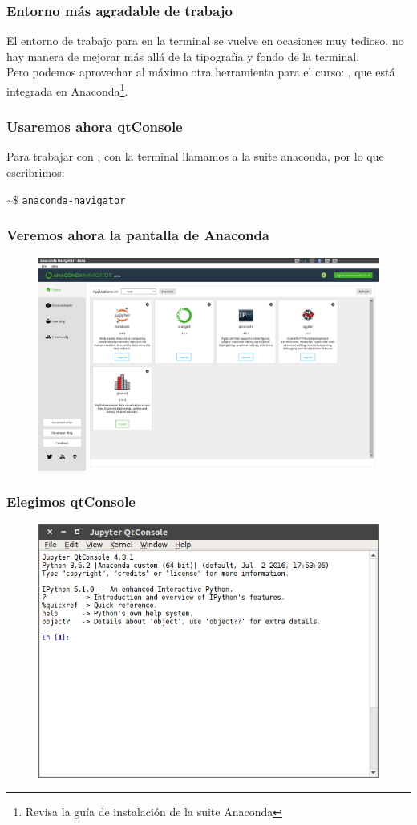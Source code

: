 {
\begin{frame}
\frametitle{Entorno más agradable de trabajo}
El entorno de trabajo para \python{} en la terminal se vuelve en ocasiones muy tedioso, no hay manera de mejorar más allá de la tipografía y fondo de la terminal.
\\
\bigskip
Pero podemos aprovechar al máximo otra herramienta para el curso: , que está integrada en Anaconda\footnote{Revisa la guía de instalación de la suite Anaconda}.
\end{frame}
\begin{frame}
\frametitle{Usaremos ahora qtConsole}
Para trabajar con , con la terminal llamamos a la suite anaconda, por lo que escribrimos:
\begin{center}
\textasciitilde $\$$ \texttt{anaconda-navigator} \keys{\return}
\end{center}
\end{frame}
\begin{frame}
\frametitle{Veremos ahora la pantalla de Anaconda}
\begin{figure}
	\centering
	\includegraphics[scale=0.2]{anaconda_01.png}
\end{figure}
\end{frame}
\begin{frame}
\frametitle{Elegimos qtConsole}
\begin{figure}
	\centering
	\includegraphics[scale=0.35]{qtConsole_01.png}

\end{figure}
\end{frame}}
